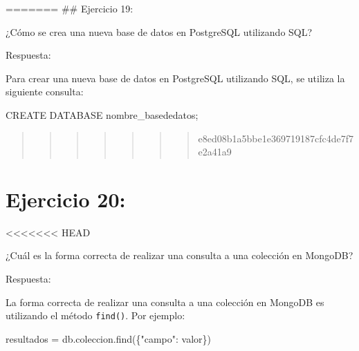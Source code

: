 \documentclass[
  a4paper,
  DIV=11,
  numbers=noendperiod,
  onepage,
  openany]{scrreprt}
\newenvironment{Shaded}{\begin{snugshade}}{\end{snugshade}}
\newcommand{\KeywordTok}[1]{\textcolor[rgb]{0.00,0.23,0.31}{#1}}
\newcommand{\NormalTok}[1]{\textcolor[rgb]{0.00,0.23,0.31}{#1}}
\newcommand{\OperatorTok}[1]{\textcolor[rgb]{0.37,0.37,0.37}{#1}}
\newcommand{\StringTok}[1]{\textcolor[rgb]{0.13,0.47,0.30}{#1}}
\begin{document}
======= \#\# Ejercicio 19:

¿Cómo se crea una nueva base de datos en PostgreSQL utilizando SQL?

Respuesta:

Para crear una nueva base de datos en PostgreSQL utilizando SQL, se
utiliza la siguiente consulta:

\begin{Shaded}
\begin{Highlighting}[]
\KeywordTok{CREATE} \KeywordTok{DATABASE}\NormalTok{ nombre\_basededatos;}
\end{Highlighting}
\end{Shaded}

\begin{quote}
\begin{quote}
\begin{quote}
\begin{quote}
\begin{quote}
\begin{quote}
\begin{quote}
e8ed08b1a5bbe1e369719187cfc4de7f7e2a41a9
\end{quote}
\end{quote}
\end{quote}
\end{quote}
\end{quote}
\end{quote}
\end{quote}

\hypertarget{ejercicio-20}{%
\chapter{Ejercicio 20:}\label{ejercicio-20}}

\textless\textless\textless\textless\textless\textless\textless{} HEAD

¿Cuál es la forma correcta de realizar una consulta a una colección en
MongoDB?

Respuesta:

La forma correcta de realizar una consulta a una colección en MongoDB es
utilizando el método \texttt{find()}. Por ejemplo:

\begin{Shaded}
\begin{Highlighting}[]
\NormalTok{resultados }\OperatorTok{=}\NormalTok{ db.coleccion.find(\{}\StringTok{"campo"}\NormalTok{: valor\})}
\end{Highlighting}
\end{Shaded}
\end{document}
